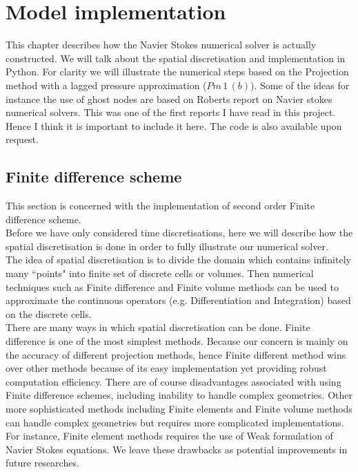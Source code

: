 \chapter{Model implementation}
\label{chapter 6}
This chapter describes how the Navier Stokes numerical solver is actually constructed. We will talk about the spatial discretisation and implementation in Python. For clarity we will illustrate the numerical steps based on the Projection method with a lagged pressure approximation ($Pm\,1\,(b)$). Some of the ideas for instance the use of ghost nodes are based on Roberts report on Navier stokes numerical solvers. This was one of the first reports I have read in this project. Hence I think it is important to include it here. The code is also available upon request.

\section{Finite difference scheme}
This section is concerned with the implementation of second order Finite difference scheme.\\

Before we have only considered time discretisations, here we will describe how the spatial discretisation is done in order to fully illustrate our numerical solver.\\

The idea of spatial discretisation is to divide the domain which contains infinitely many ``points" into finite set of discrete cells or volumes. Then numerical techniques such as Finite difference and Finite volume methods can be used to approximate the continuous operators (e.g. Differentiation and Integration) based on the discrete cells.\\

There are many ways in which spatial discretisation can be done. Finite difference is one of the most simplest methods. Because our concern is mainly on the accuracy of different projection methods, hence Finite different method wins over other methods because of its easy implementation yet providing robust computation efficiency. There are of course disadvantages associated with using Finite difference schemes, including inability to handle complex geometries.  Other more sophisticated methods including Finite elements and Finite volume methods can handle complex geometries but requires more complicated implementations. For instance, Finite element methods requires the use of Weak formulation of Navier Stokes equations. We leave these drawbacks as potential improvements in future researches.\\

